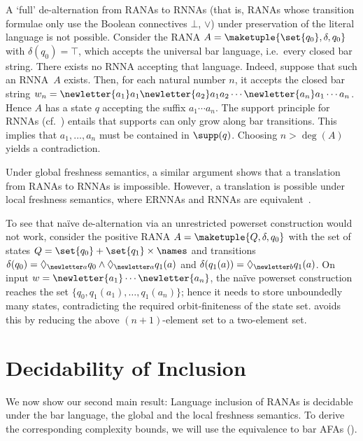 \documentclass[10pt, final, conference, a4paper, twocolumn]{IEEEtran}
\begin{document}
\begin{rem}%
A `full' de-alternation from RANAs to RNNAs (that is, RANAs whose transition formulae only use the Boolean connectives $\bot$, $\vee$) under preservation of the literal language is not possible. Consider the RANA $A = \maketuple{\set{q_0},\delta,q_0}$ with
    $\delta(q_0) = \top$, which accepts the universal bar language, i.e.~every closed bar string.
    There exists no RNNA accepting that language. Indeed, suppose that such an RNNA~$A$ exists.
    Then, for each natural number $n$, it accepts the closed bar string
    $w_n = \newletter{a_1}a_1\newletter{a_2}a_1a_2\cdots\newletter{a_n}a_1\cdots a_n$.
    Hence $A$ has a state $q$ accepting the suffix $a_1 \cdots a_n$. The support principle for RNNAs
    (cf.~\cite[Lemma~5.4]{skmw17}) entails that supports can only grow along bar transitions. This
    implies that $a_1, \dots, a_n$ must be contained in $\supp(q)$. Choosing $n>\deg(A)$ yields a contradiction.

    Under global freshness semantics, a similar argument shows that a translation from RANAs
    to RNNAs is impossible. However, a translation is possible under local freshness semantics,
    where ERNNAs and RNNAs are equivalent~\cite[Rem.~5.2]{hms21}. 
\end{rem}

\begin{rem}\label{rem:powerset}%
To see that naïve de-alternation via an unrestricted powerset construction would not work,
consider the positive RANA $A = \maketuple{Q, \delta, q_0}$ with the set of states $Q = \set{q_0} +
  \set{q_1} \times \names$ and transitions $\delta(q_0) = \Diamond_{\newletter a} q_0 \wedge \Diamond_{\newletter a} q_1(a)$ and $\delta(q_1(a)) = \Diamond_{\newletter b} q_1(a)$.
  On input $w = \newletter{a_1}\cdots\newletter{a_n}$, the naïve powerset construction reaches the set $\{q_0,q_1(a_1),\ldots, q_1(a_n)\}$; hence it needs to store unboundedly many states, contradicting the required orbit-finiteness of
  the state set.
   avoids this by reducing the above $(n+1)$-element set to a two-element set.
\end{rem}

\section{Decidability of Inclusion} \label{sec:decincl}

We now show our second main result:
Language inclusion of RANAs is decidable under the bar language, the global and the local freshness semantics.
To derive the corresponding complexity bounds, we will use the equivalence to bar AFAs ().
\end{document}

